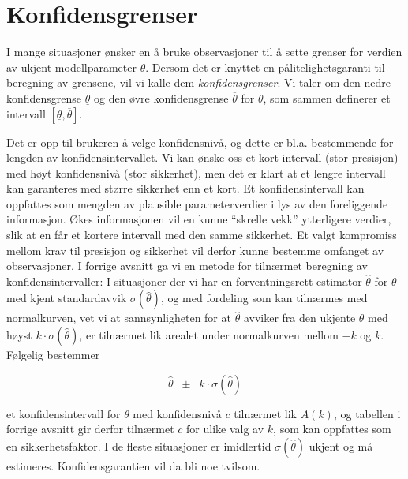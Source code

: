 \section{Konfidensgrenser}

I mange situasjoner ønsker en å bruke observasjoner til å sette
grenser for verdien av ukjent modellparameter $\theta $. Dersom
det er knyttet en pålitelig\-hets\-garanti til beregning av grensene,
vil vi kalle dem {\em konfidensgrenser}. Vi taler om den nedre
konfidensgrense $\underline{\theta}$ og den øvre konfidensgrense
 $\overline{\theta}$ for
$\theta $, som sammen definerer et intervall 
$[\underline{\theta},\overline{\theta}]$.

\begin{center}  \end{center}

\noindent Det er opp til brukeren å velge
konfidensnivå, og dette er bl.a. bestemmende for lengden av
konfidensintervallet. Vi kan ønske oss et kort intervall (stor
presisjon) med høyt konfidensnivå (stor sikkerhet), men det er
klart at et lengre intervall kan garanteres med større sikkerhet
enn et kort. Et konfidensintervall kan oppfattes som mengden av
plausible parameterverdier i lys av den foreliggende informasjon.
Økes informasjonen vil en kunne ``skrelle vekk'' ytterligere
verdier, slik at en får et kortere intervall med den samme
sikkerhet. Et valgt kompromiss mellom krav til presisjon og
sikkerhet vil derfor kunne bestemme omfanget av observasjoner. I
forrige avsnitt ga vi en metode for tilnærmet beregning av
konfidensintervaller: I situasjoner der vi har en
forventningsrett estimator $\hat{\theta}$ for $\theta$ med kjent
standardavvik $\sigma (\hat{\theta})$, og med fordeling som kan
tilnærmes med normalkurven, vet vi at sannsynligheten for at 
$\hat{\theta}$ avviker fra den ukjente $\theta$ med høyst $k\cdot \sigma
(\hat{\theta})$, er tilnærmet lik arealet under normalkurven mellom $-k$
og $k$. Følgelig bestemmer

\[ \hat{\theta} \;\;\pm \;\; k \cdot \sigma (\hat{\theta}) \]

\noindent et konfidensintervall for $\theta$ med konfidensnivå $c$
tilnærmet lik $A(k)$, og tabellen i forrige avsnitt gir derfor 
tilnærmet $c$ for ulike valg av $k$, som kan oppfattes som en
sikkerhetsfaktor. I de fleste situasjoner er imidlertid $\sigma
(\hat{\theta})$ ukjent og må estimeres. Konfidensgarantien vil da bli
noe tvilsom.

